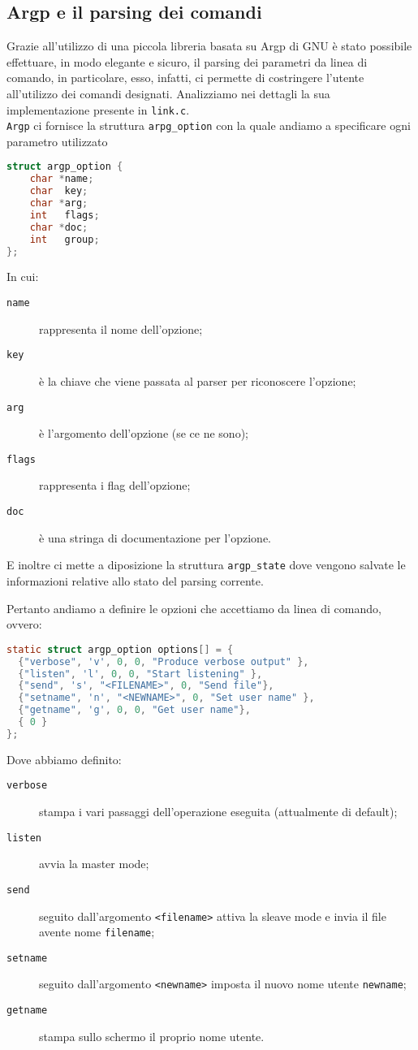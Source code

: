 \documentclass[11pt,fleqn]{book} %
\begin{document}
\subsection{Argp e il parsing dei comandi}
Grazie all'utilizzo di una piccola libreria basata su Argp di GNU  è stato possibile effettuare, in modo elegante e sicuro, il parsing dei parametri da linea di comando, in particolare, esso, infatti, ci permette di costringere l'utente all'utilizzo dei comandi designati. Analizziamo nei dettagli la sua implementazione presente in \texttt{link.c}.\\
\texttt{Argp} ci fornisce la struttura \texttt{arpg\_option} con la quale andiamo a specificare ogni parametro utilizzato
\begin{lstlisting}[language=C]
struct argp_option {
    char *name;
    char  key;
    char *arg;
    int   flags;
    char *doc;
    int   group;    
};
\end{lstlisting}
In cui:
\medskip
\begin{description}
	\item [\texttt{name}] rappresenta il nome dell'opzione;
	\item [\texttt{key}] è la chiave che viene passata al parser per riconoscere l'opzione;
	\item [\texttt{arg}] è l'argomento dell'opzione (se ce ne sono);
	\item [\texttt{flags}] rappresenta i flag dell'opzione;
	\item [\texttt{doc}] è una stringa di documentazione per l'opzione.
\end{description}
\medskip

\noindent E inoltre ci mette a diposizione la struttura \texttt{argp\_state} dove vengono salvate le informazioni relative allo stato del parsing corrente.

\noindent Pertanto andiamo a definire le opzioni che accettiamo da linea di comando, ovvero:
\begin{lstlisting}[language=C]
	static struct argp_option options[] = {
  {"verbose", 'v', 0, 0, "Produce verbose output" },
  {"listen", 'l', 0, 0, "Start listening" },
  {"send", 's', "<FILENAME>", 0, "Send file"},
  {"setname", 'n', "<NEWNAME>", 0, "Set user name" },
  {"getname", 'g', 0, 0, "Get user name"},
  { 0 }
};
\end{lstlisting}
Dove abbiamo definito:
\medskip
\begin{description}
	\item [\texttt{verbose}] stampa i vari passaggi dell'operazione eseguita (attualmente di default);
	\item [\texttt{listen}] avvia la master mode;
	\item [\texttt{send}]  seguito dall'argomento \texttt{<filename>} attiva la sleave mode e invia il file avente nome 					\texttt{filename};
	\item [\texttt{setname}] seguito dall'argomento \texttt{<newname>} imposta il nuovo nome utente \texttt{newname};
	\item [\texttt{getname}] stampa sullo schermo il proprio nome utente.
\end{description}
\medskip
\end{document}
